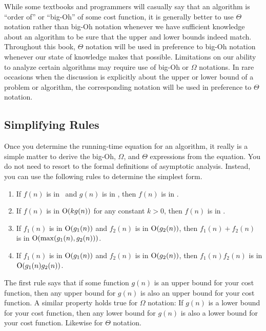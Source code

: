 While some textbooks and programmers will casually say that an
algorithm is ``order of'' or ``big-Oh'' of some cost function,
it is generally better to use \(\Theta\) notation rather than big-Oh
notation whenever we have sufficient knowledge about an algorithm to
be sure that the upper and lower bounds indeed match.
Throughout this book, \(\Theta\) notation will be used in preference to
big-Oh notation whenever our state of knowledge makes that possible.
Limitations on our ability to analyze certain algorithms may require
use of big-Oh or \(\Omega\) notations.
In rare occasions when the discussion is explicitly about the upper or 
lower bound of a problem or algorithm, the corresponding notation will
be used in preference to \(\Theta\) notation.

\subsection{Simplifying Rules}
\label{SimpRule}

Once you determine the running-time equation for an algorithm,
it really is a simple matter to derive the big-Oh, \(\Omega\), and
\(\Theta\) expressions from the equation.
You do not need to resort to the formal definitions of asymptotic
analysis.
Instead, you can use the following rules to
determine the simplest form.

\begin{enumerate}

\item
If \(f(n)\) is in \Ogn\ and \(g(n)\) is in \Ohn, then \(f(n)\) is in
\Ohn.

\item
If \(f(n)\) is in \({\rm O}(k g(n))\) for any constant \(k > 0\),
then \(f(n)\) is in \Ogn.

\item
If \(f_1(n)\) is in \({\rm O}(g_1(n))\) and \(f_2(n)\) is in
\({\rm O}(g_2(n))\),
then \(f_1(n) + f_2(n)\) is in \({\rm O}(\max(g_1(n), g_2(n)))\).

\item
If \(f_1(n)\) is in \({\rm O}(g_1(n))\) and \(f_2(n)\) is in
\({\rm O}(g_2(n))\), then \(f_1(n) f_2(n)\) is in
\({\rm O}(g_1(n) g_2(n))\).

\end{enumerate}

The first rule says that if some function \(g(n)\) is an upper bound
for your cost function, then any upper bound for \(g(n)\) is also an
upper bound for your cost function.
A similar property holds true for \(\Omega\) notation:
If \(g(n)\) is a lower bound for your cost function, then any lower
bound for \(g(n)\) is also a lower bound for your cost function.
Likewise for \(\Theta\) notation.


